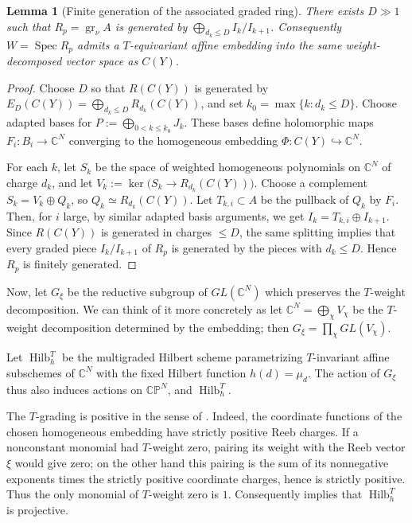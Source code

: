 \documentclass[11pt]{amsart}
\newtheorem{lemma}[theorem]{Lemma}
\theoremstyle{definition}
\theoremstyle{remark}
\begin{document}
\begin{lemma}[Finite generation of the associated graded ring]
There exists $D\gg1$ such that $R_p=\operatorname{gr}_\nu A$ is generated by $\bigoplus_{d_k\leq D}I_k/I_{k+1}$. Consequently $W=\operatorname{Spec}R_p$ admits a $T$-equivariant affine embedding into the same weight-decomposed vector space as $C(Y)$.
\end{lemma}

\begin{proof}
Choose $D$ so that $R(C(Y))$ is generated by
$E_D(C(Y))=\bigoplus_{d_k\leq D}R_{d_k}(C(Y))$, and set
$k_0=\max\{k:d_k\leq D\}$. Choose adapted bases for $P:=\bigoplus_{0<k\leq k_0}J_k$.
These bases define holomorphic maps $F_i:B_i\to\mathbb C^N$ converging to the
homogeneous embedding $\Phi:C(Y)\hookrightarrow\mathbb C^N$.

For each $k$, let $S_k$ be the space of weighted homogeneous polynomials on
$\mathbb C^N$ of charge $d_k$, and let $V_k:=\ker\bigl(S_k\to R_{d_k}(C(Y))\bigr)$.
Choose a complement $S_k=V_k\oplus Q_k$, so $Q_k\simeq R_{d_k}(C(Y))$.
Let $T_{k,i}\subset A$ be the pullback of $Q_k$ by $F_i$. Then, for $i$ large, by similar adapted basis arguments, we get $I_k=T_{k,i}\oplus I_{k+1}$. Since $R(C(Y))$ is generated in charges $\leq D$, the
same splitting implies that every graded piece $I_k/I_{k+1}$ of $R_p$ is
generated by the pieces with $d_k\leq D$. Hence $R_p$ is finitely generated.
\end{proof}

Now, let $G_\xi$ be the reductive subgroup of $GL(\mathbb{C}^N)$ which preserves the $T$-weight decomposition. We can think of it more concretely as let $\mathbb{C}^N = \bigoplus_{\chi} V_\chi$ be the $T$-weight decomposition determined by the embedding; then $G_\xi = \prod_{\chi} GL(V_\chi)$. 

Let $\operatorname{Hilb}_h^T$ be the multigraded Hilbert scheme parametrizing $T$-invariant affine subschemes of $\mathbb C^N$ with the fixed Hilbert function $h(d)=\mu_d.$ The action of $G_\xi$ thus also induces actions on $\mathbb{CP}^N$, and $\operatorname{Hilb}_h^T$. 

The $T$-grading is positive in the sense of
\cite[Corollary~1.2]{HaimanSturmfels}. Indeed, the coordinate functions of the
chosen homogeneous embedding have strictly positive Reeb charges. If a
nonconstant monomial had $T$-weight zero, pairing its weight with the Reeb
vector $\xi$ would give zero; on the other hand this pairing is the sum of its
nonnegative exponents times the strictly positive coordinate charges, hence is
strictly positive. Thus the only monomial of $T$-weight zero is $1$.
Consequently \cite[Corollary~1.2]{HaimanSturmfels} implies that
$\operatorname{Hilb}_h^T$ is projective.
\end{document}
